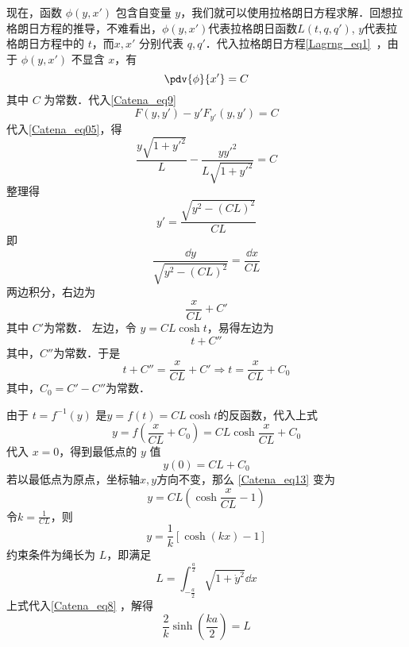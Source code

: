 现在，函数 $\phi(y,x')$ 包含自变量 $y$，我们就可以使用拉格朗日方程求解．回想拉格朗日方程的推导，不难看出，$\phi(y,x')$代表拉格朗日函数$L(t,q,q')$, $y$代表拉格朗日方程中的 $t$，而$x,x'$ 分别代表 $q,q'$．代入拉格朗日方程\autoref{Lagrng_eq1}~，由于 $\phi(y,x')$ 不显含 $x$，有
\begin{equation}
\pdv{\phi}{x'}=C
\end{equation}
其中 $C$ 为常数．代入\autoref{Catena_eq9} 
\begin{equation}
F(y,y')-y'F_{y'}(y,y')=C
\end{equation}
代入\autoref{Catena_eq05}，得
\begin{equation}
\frac{y\sqrt{1+y'^2}}{L}-\frac{yy'^2}{L\sqrt{1+y'^2}}=C
\end{equation}
整理得
\begin{equation}
y'=\frac{\sqrt{y^2-(CL)^2}}{CL}
\end{equation}
即
\begin{equation}
\frac{\dd y}{\sqrt{y^2-(CL)^2}}=\frac{\dd x}{CL}
\end{equation}
两边积分，右边为
\begin{equation}
\frac{x}{CL}+C'
\end{equation}
其中 $C'$为常数．
左边，令 $y=CL\cosh t $，易得左边为
\begin{equation}
t+C''
\end{equation}
其中，$C''$为常数．于是
\begin{equation}
t+C''=\frac{x}{CL}+C'\Rightarrow t=\frac{x}{CL}+C_0
\end{equation}
其中，$C_0=C'-C''$为常数．

由于 $t=f^{-1}(y)$ 是$y=f(t)=CL\cosh t$的反函数，代入上式
\begin{equation}\label{Catena_eq13}
y=f(\frac{x}{CL}+C_0)=CL\cosh \frac{x}{CL}+C_0
\end{equation}
代入 $x=0$，得到最低点的 $y$ 值
\begin{equation}
y(0)=CL+C_0
\end{equation}
若以最低点为原点，坐标轴$x,y$方向不变，那么 \autoref{Catena_eq13} 变为
\begin{equation}
y=CL(\cosh \frac{x}{CL}-1)
\end{equation}
令$k=\frac{1}{CL}$，则
\begin{equation}\label{Catena_eq8}
y=\frac{1}{k}[\cosh (kx)-1]
\end{equation}
约束条件为绳长为 $L$，即满足
\begin{equation}
L = \int_{-\frac{a}{2}}^{\frac{a}{2}} \sqrt{1 + \dot y^2} \dd{x}
\end{equation}
上式代入\autoref{Catena_eq8} ，解得
\begin{equation}
\frac{2}{k}\sinh(\frac{ka}{2}) = L
\end{equation}
